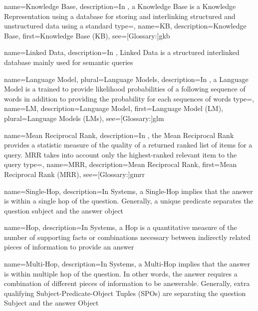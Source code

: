 {
  name={Knowledge Base},
  description={In , a Knowledge Base is a Knowledge Representation using a  database for storing and interlinking structured and unstructured data using a standard}
}
{
  type=\acronymtype,
  name={KB},
  description={Knowledge Base},
  first={Knowledge Base (KB)},
  see=[Glossary:]{gkb}
}


{
  name={Linked Data},
  description={In , Linked Data is a structured interlinked database mainly used for semantic queries}
}

{
  name={Language Model},
  plural={Language Models},
  description={In , a Language Model is a  trained to provide likelihood probabilities of a following sequence of words in addition to providing the probability for each sequences of words}
}
{
  type=\acronymtype,
  name={LM},
  description={Language Model},
  first={Language Model (LM)},
  plural={Language Models (LMs)},
  see=[Glossary:]{glm}
}

{
  name={Mean Reciprocal Rank},
  description={In , the Mean Reciprocal Rank provides a statistic measure of the quality of a returned ranked list of items for a query. MRR takes into account only the highest-ranked relevant item to the query}
}
{
  type=\acronymtype,
  name={MRR},
  description={Mean Reciprocal Rank},
  first={Mean Reciprocal Rank (MRR)},
  see=[Glossary:]{gmrr}
}


{
  name={Single-Hop},
  description={In  Systems, a Single-Hop implies that the answer is within a single \gls{hop} of the question. Generally, a unique predicate separates the question subject and the answer object}
}

{
  name={Hop},
  description={In  Systems, a Hop is a quantitative measure of the number of supporting facts or combinations necessary between indirectly related pieces of information to provide an answer}
}


{
  name={Multi-Hop},
  description={In  Systems, a Multi-Hop implies that the answer is within multiple \gls{hop} of the question. In other words, the answer requires a combination of different pieces of information to be answerable. Generally, extra qualifying Subject-Predicate-Object Tuples (SPOs) are separating the question Subject and the answer Object}
}

